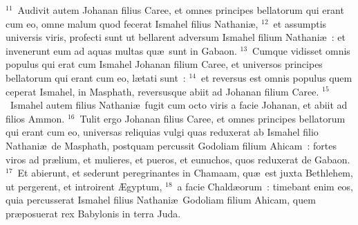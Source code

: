 ${}^{11}$~Audivit autem Johanan filius Caree, et omnes principes bellatorum qui erant cum eo, omne malum quod fecerat Ismahel filius Nathani\ae ,
${}^{12}$~et assumptis universis viris, profecti sunt ut bellarent adversum Ismahel filium Nathani\ae~: et invenerunt eum ad aquas multas qu\ae\ sunt in Gabaon.
${}^{13}$~Cumque vidisset omnis populus qui erat cum Ismahel Johanan filium Caree, et universos principes bellatorum qui erant cum eo, l\ae tati sunt~:
${}^{14}$~et reversus est omnis populus quem ceperat Ismahel, in Masphath, reversusque abiit ad Johanan filium Caree.
${}^{15}$~Ismahel autem filius Nathani\ae\ fugit cum octo viris a facie Johanan, et abiit ad filios Ammon.
${}^{16}$~Tulit ergo Johanan filius Caree, et omnes principes bellatorum qui erant cum eo, universas reliquias vulgi quas reduxerat ab Ismahel filio Nathani\ae\ de Masphath, postquam percussit Godoliam filium Ahicam~: fortes viros ad pr\ae lium, et mulieres, et pueros, et eunuchos, quos reduxerat de Gabaon.
${}^{17}$~Et abierunt, et sederunt peregrinantes in Chamaam, qu\ae\ est juxta Bethlehem, ut pergerent, et introirent \AE gyptum,
${}^{18}$~a facie Chald\ae orum~: timebant enim eos, quia percusserat Ismahel filius Nathani\ae\ Godoliam filium Ahicam, quem pr\ae posuerat rex Babylonis in terra Juda.

